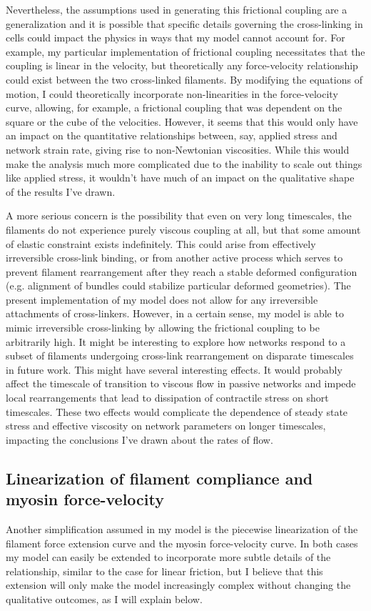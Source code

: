 Nevertheless, the assumptions used in generating this frictional coupling are a generalization and it is possible that specific details governing the cross-linking in cells could impact the physics in ways that my model cannot account for.   For example, my particular implementation of frictional coupling necessitates that the coupling is linear in the velocity, but theoretically any force-velocity relationship could exist between the two cross-linked filaments.  By modifying the equations of motion, I could theoretically incorporate non-linearities in the force-velocity curve, allowing, for example, a frictional coupling that was dependent on the square or the cube of the velocities.  However, it seems that this would only have an impact on the quantitative relationships between, say, applied stress and network strain rate, giving rise to non-Newtonian viscosities.  While this would make the analysis much more complicated due to the inability to scale out things like applied stress, it wouldn't have much of an impact on the qualitative shape of the results I've drawn.

A more serious concern is the possibility that even on very long timescales, the filaments do not experience purely viscous coupling at all, but that some amount of elastic constraint exists indefinitely.  This could arise from effectively irreversible cross-link binding, or from another active process which serves to prevent filament rearrangement after they reach a stable deformed configuration (e.g. alignment of bundles could stabilize particular deformed geometries).  The present implementation of my model does not allow for any irreversible attachments of cross-linkers.  However, in a certain sense, my model is able to mimic irreversible cross-linking by allowing the frictional coupling to be arbitrarily high.  It might be interesting to explore how networks respond to a subset of filaments undergoing cross-link rearrangement on disparate timescales in future work. This might have several interesting effects.  It would probably affect the timescale of transition to viscous flow in passive networks and impede local rearrangements that lead to dissipation of contractile stress on short timescales.  These two effects would complicate the dependence of steady state stress and effective viscosity on network parameters on longer timescales, impacting the conclusions I've drawn about the rates of flow.  


\subsection{Linearization of filament compliance and myosin force-velocity}
Another simplification assumed in my model is the piecewise linearization of the filament force extension curve and the myosin force-velocity curve. In both cases my model can easily be extended to incorporate more subtle details of the relationship, similar to the case for linear friction, but I believe that this extension will only make the model increasingly complex without changing the qualitative outcomes, as I will explain below.

